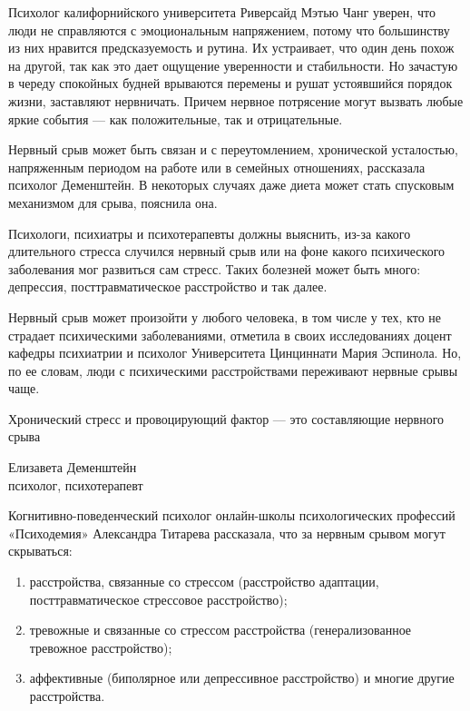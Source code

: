 Психолог калифорнийского университета Риверсайд Мэтью Чанг уверен, что люди не справляются с эмоциональным напряжением, потому что большинству из них нравится предсказуемость и рутина. Их устраивает, что один день похож на другой, так как это дает ощущение уверенности и стабильности. Но зачастую в череду спокойных будней врываются перемены и рушат устоявшийся порядок жизни, заставляют нервничать. Причем нервное потрясение могут вызвать любые яркие события — как положительные, так и отрицательные.

Нервный срыв может быть связан и с переутомлением, хронической усталостью, напряженным периодом на работе или в семейных отношениях, рассказала психолог Деменштейн. В некоторых случаях даже диета может стать спусковым механизмом для срыва, пояснила она.

Психологи, психиатры и психотерапевты должны выяснить, из-за какого длительного стресса случился нервный срыв или на фоне какого психического заболевания мог развиться сам стресс. Таких болезней может быть много: депрессия, посттравматическое расстройство и так далее.

Нервный срыв может произойти у любого человека, в том числе у тех, кто не страдает психическими заболеваниями, отметила в своих исследованиях доцент кафедры психиатрии и психолог Университета Цинциннати Мария Эспинола. Но, по ее словам, люди с психическими расстройствами переживают нервные срывы чаще.

\begin{fancyquotes}
    Хронический стресс и провоцирующий фактор — это составляющие нервного срыва\\

    \begin{flushright}
        Елизавета Деменштейн\\
        психолог, психотерапевт
    \end{flushright}
\end{fancyquotes}

Когнитивно-поведенческий психолог онлайн-школы психологических профессий «Психодемия» Александра Титарева рассказала, что за нервным срывом могут скрываться:

\begin{enumerate}
    \item расстройства, связанные со стрессом (расстройство адаптации, посттравматическое стрессовое расстройство);
    \item тревожные и связанные со стрессом расстройства (генерализованное тревожное расстройство);
    \item аффективные (биполярное или депрессивное расстройство) и многие другие расстройства.
\end{enumerate}

